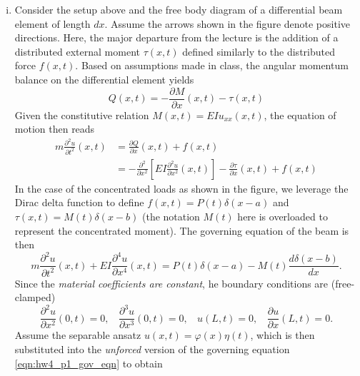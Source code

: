 \begin{enumerate}[(i)]
\item { %
    Consider the setup above and the free body diagram of a differential beam element of length $dx$. 
    Assume the arrows shown in the figure denote positive directions. 
    Here, the major departure from the lecture is the addition of a distributed external moment $\tau(x, t)$ defined similarly to the distributed force $f(x, t)$. 
    Based on assumptions made in class, the angular momentum balance on the differential element yields 
    \begin{equation}
        Q(x, t) = -\frac{\partial M}{\partial x}(x, t) - \tau(x, t)
    \end{equation}
    Given the constitutive relation $M(x, t) = EI u_{xx}(x, t)$, the equation of motion then reads
    \begin{equation}
    \begin{aligned}
        m \frac{\partial^2 u}{\partial t^2}(x, t) &= \frac{\partial Q}{\partial x}(x, t) + f(x, t) \\
        &= -\frac{\partial^2}{\partial x^2} \left[EI \frac{\partial^2 u}{\partial x^2}(x, t) \right] - \frac{\partial \tau}{\partial x}(x, t) + f(x, t)
    \end{aligned}
    \end{equation}
    In the case of the concentrated loads as shown in the figure, we leverage the Dirac delta function to define $f(x, t) = P(t)\delta(x - a)$ and $\tau(x, t) = M(t)\delta(x - b)$ (the notation $M(t)$ here is overloaded to represent the concentrated moment).
    The governing equation of the beam is then
    \begin{equation}\label{eqn:hw4_p1_gov_eqn}
        m \frac{\partial^2 u}{\partial t^2}(x, t) + EI \frac{\partial^4 u}{\partial x^4}(x, t) = P(t) \delta(x - a) - M(t) \frac{d \delta(x - b)}{dx}.
    \end{equation}
    Since the \emph{material coefficients are constant}, he boundary conditions are (free-clamped)
    \begin{equation}\label{eqn:hw4_p1_bc}
        \frac{\partial^2 u}{\partial x^2}(0, t) = 0, ~~~~ \frac{\partial^3 u}{\partial x^3}(0, t) = 0, ~~~~ u(L, t) = 0, ~~~~ \frac{\partial u}{\partial x}(L, t) = 0.
    \end{equation}
    Assume the separable ansatz $u(x, t) = \varphi(x) \eta(t)$, which is then substituted into the \emph{unforced} version of the governing equation \cref{eqn:hw4_p1_gov_eqn} to obtain 
    \begin{subequations}

\end{subequations}}
\end{enumerate}
